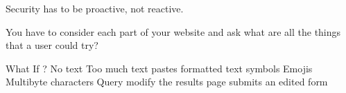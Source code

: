 Security has to be proactive, not reactive.

You have to consider each part of your website and ask what are all the things that a user could try? 

What If ? 
  No text 
  Too much text 
  pastes formatted text 
  symbols 
  Emojis
  Multibyte characters 
  Query modify the results page 
  submits an edited form 
